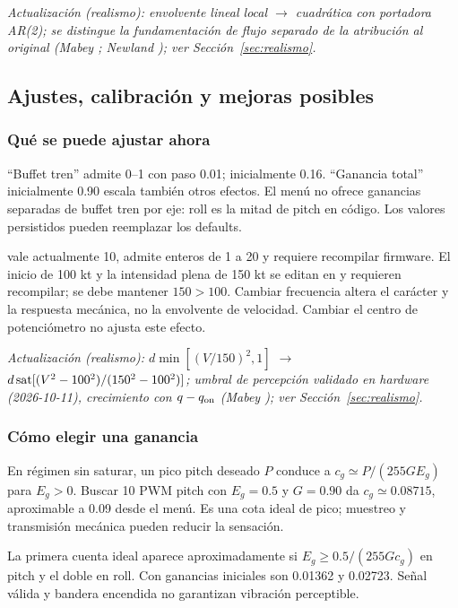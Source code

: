 \textit{Actualización (realismo): envolvente lineal local $\rightarrow$ cuadrática con portadora AR(2); se distingue la fundamentación de flujo separado de la atribución al original (Mabey \cite{mabey1988}; Newland \cite{newland1993}); ver Sección~\ref{sec:realismo}.}

\subsection{Ajustes, calibración y mejoras posibles}
\subsubsection{Qué se puede ajustar ahora}
``Buffet tren'' admite 0--1 con paso 0.01; inicialmente 0.16. ``Ganancia total'' inicialmente 0.90 escala también otros efectos. El menú no ofrece ganancias separadas de buffet tren por eje: roll es la mitad de pitch en código. Los valores persistidos pueden reemplazar los defaults.

 vale actualmente 10, admite enteros de 1 a 20 y requiere recompilar firmware. %
El inicio de 100 kt y la intensidad plena de 150 kt se editan en  y requieren recompilar; se debe mantener $150>100$. Cambiar frecuencia altera el carácter y la respuesta mecánica, no la envolvente de velocidad. Cambiar el centro de potenciómetro no ajusta este efecto.

\textit{Actualización (realismo): $d\min[(V/150)^2,1]$ $\rightarrow$ $d\operatorname{sat}[(V^2-100^2)/(150^2-100^2)]$; umbral de percepción validado en hardware (2026-10-11), crecimiento con $q-q_{\rm on}$ (Mabey \cite{mabey1988}); ver Sección~\ref{sec:realismo}.}

\subsubsection{Cómo elegir una ganancia}
En régimen sin saturar, un pico pitch deseado $P$ conduce a $c_g\simeq P/(255GE_g)$ para $E_g>0$. Buscar 10 PWM pitch con $E_g=0.5$ y $G=0.90$ da $c_g\simeq0.08715$, aproximable a 0.09 desde el menú. Es una cota ideal de pico; muestreo y transmisión mecánica pueden reducir la sensación.

La primera cuenta ideal aparece aproximadamente si $E_g\ge0.5/(255Gc_g)$ en pitch y el doble en roll. Con ganancias iniciales son 0.01362 y 0.02723. Señal válida y bandera encendida no garantizan vibración perceptible.

